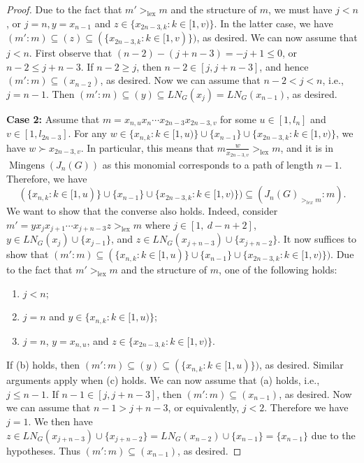 \documentclass{amsart}
\theoremstyle{remark}
\theoremstyle{definition}
\DeclareMathOperator{\mingens}{Mingens}
\DeclareMathOperator{\lex}{lex}
\begin{document}
\begin{proof}
		Due to the fact that $m'>_{\lex}  m$ and the structure of $m$, we must have $j<n$, or $j=n, y=x_{n-1}$ and $z\in \{x_{2n-3,k}\colon k\in [1,v)\}$. In the latter case, we have $(m'\colon m)\subseteq (z)\subseteq (\{x_{2n-3,k}\colon k\in [1,v)\})$, as desired. We can now assume that $j< n$. First observe that $(n-2)-(j+n-3) = -j+1 \leq 0$, or $n-2\leq j+n-3$. If $n-2\geq j$, then $n-2\in [j,j+n-3]$, and hence  $(m'\colon m)\subseteq (x_{n-2})$, as desired. Now we can assume that $n-2<j<n$, i.e., $j=n-1$. Then   $(m'\colon m)\subseteq (y)\subseteq LN_G(x_{j})=LN_G(x_{n-1})$, as desired.
		
		\textbf{Case 2:} Assume that $m= x_{n,u} x_{n}\cdots x_{2n-3}x_{2n-3,v}$
		for some $u\in[1,l_{n}]$ and $v\in [1,l_{2n-3}]$. For any $w\in \{x_{n,k}\colon k\in [1,u)\} \cup \{x_{n-1}\} \cup \{x_{2n-3,k}\colon k\in [1,v)\}$, we have $w\succ x_{2n-3,v}$. In particular, this means that  $m\frac{w}{x_{2n-3,v}} >_{\lex}  m$, and it is in $\mingens(J_n(G))$ as this monomial corresponds to a path of length $n-1$. Therefore, we have 
		\[
		(\{x_{n,k}\colon k\in [1,u)\} \cup \{x_{n-1}\} \cup \{x_{2n-3,k}\colon k\in [1,v)\}) \subseteq (J_n(G)_{>_{lex}m} \colon m).
		\]
		We want to show that the converse also holds. Indeed, consider $m'=yx_jx_{j+1}\cdots x_{j+n-3}z>_{\lex}  m$ where $j\in [1,\ d-n+2]$, $y\in LN_G(x_j)\cup \{x_{j-1}\}$, and $z\in  LN_G(x_{j+n-3})\cup \{x_{j+n-2}\}$. It now suffices to show that $(m':m)\subseteq (\{x_{n,k}\colon k\in [1,u)\} \cup \{x_{n-1}\} \cup \{x_{2n-3,k}\colon k\in [1,v)\})$. Due to the fact that $m'>_{\lex}  m$ and the structure of $m$, one of the following holds:
		\begin{enumerate}
			\item[(a)] $j<n$;
			\item[(b)] $j=n$ and $y\in \{x_{n,k}\colon k\in [1,u)\}$;
			\item[(c)] $j=n$, $y=x_{n,u}$, and $z\in \{x_{2n-3,k}\colon k\in [1,v)\}$.
		\end{enumerate}
		If (b) holds, then $(m'\colon m)\subseteq (y) \subseteq (\{x_{n,k}\colon k\in [1,u)\})$, as desired. Similar arguments apply when (c) holds. We can now assume that (a) holds, i.e., $j\leq n-1$. If $n-1\in [j,j+n-3]$, then $(m'\colon m) \subseteq (x_{n-1})$, as desired. Now we can assume that $n-1>j+n-3$, or equivalently, $j<2$. Therefore we have $j=1$. We then have $z\in LN_G(x_{j+n-3})\cup \{x_{j+n-2}\} = LN_G(x_{n-2})\cup \{x_{n-1}\} = \{x_{n-1}\}$ due to the hypotheses. Thus $(m'\colon m) \subseteq (x_{n-1})$, as desired.
	\end{proof}
	
\end{document}
